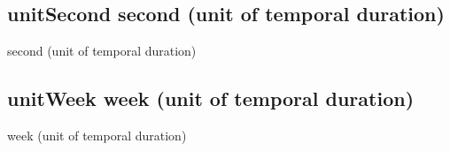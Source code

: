 \documentclass[letterpaper,10pt,english]{sphinxmanual}
\begin{document}
\subsection{unitSecond \sphinxhyphen{} second (unit of temporal duration)}
\label{\detokenize{doc-unitSecond:unitsecond-second-unit-of-temporal-duration}}\label{\detokenize{doc-unitSecond:index-0}}\label{\detokenize{doc-unitSecond::doc}}
\begin{sphinxShadowBox}

\sphinxAtStartPar
second (unit of temporal duration)
\end{sphinxShadowBox}

\begin{sphinxShadowBox}

\sphinxAtStartPar
{}
\end{sphinxShadowBox}
\begin{quote}

\ignorespaces \end{quote}


\subsection{unitWeek \sphinxhyphen{} week (unit of temporal duration)}
\label{\detokenize{doc-unitWeek:unitweek-week-unit-of-temporal-duration}}\label{\detokenize{doc-unitWeek:index-0}}\label{\detokenize{doc-unitWeek::doc}}
\begin{sphinxShadowBox}

\sphinxAtStartPar
week (unit of temporal duration)
\end{sphinxShadowBox}

\begin{sphinxShadowBox}

\sphinxAtStartPar
{}
\end{sphinxShadowBox}
\begin{quote}

\ignorespaces \end{quote}
\end{document}
